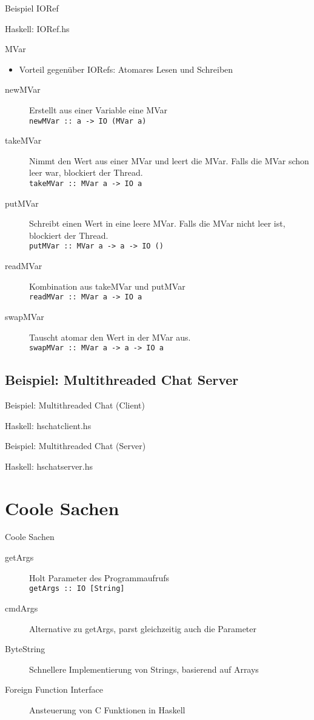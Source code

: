 \documentclass{beamer}
\newcommand{\code}[2]
{
	\begin{block}{#1: #2}
	
	\end{block}
}
\begin{document}
\begin{frame}[fragile]{Beispiel IORef}
\tiny
\code{Haskell}{IORef.hs}
\end{frame}

\begin{frame}[<+->]{MVar}
\begin{itemize}
\item Vorteil gegenüber IORefs: Atomares Lesen und Schreiben
\end{itemize}
\begin{description}
\item[newMVar] Erstellt aus einer Variable eine MVar \\ \texttt{newMVar :: a -> IO (MVar a)}
\item[takeMVar] Nimmt den Wert aus einer MVar und leert die MVar. Falls die MVar schon leer war, blockiert der Thread. \\ \texttt{takeMVar :: MVar a -> IO a}
\item[putMVar] Schreibt einen Wert in eine leere MVar. Falls die MVar nicht leer ist, blockiert der Thread. \\
\texttt{putMVar :: MVar a -> a -> IO ()}
\item[readMVar] Kombination aus takeMVar und putMVar \\ \texttt{readMVar :: MVar a -> IO a}
\item[swapMVar] Tauscht atomar den Wert in der MVar aus. \\ \texttt{swapMVar :: MVar a -> a -> IO a}
\end{description}
\end{frame}

\subsection{Beispiel: Multithreaded Chat Server}
\begin{frame}{Beispiel: Multithreaded Chat (Client)}
\tiny
\code{Haskell}{hschatclient.hs}
\end{frame}
\begin{frame}{Beispiel: Multithreaded Chat (Server) }
\tiny
\code{Haskell}{hschatserver.hs}
\end{frame}

\section{Coole Sachen}
\begin{frame}[<+->]{Coole Sachen}
\begin{description}
\item[getArgs] Holt Parameter des Programmaufrufs \\ \texttt{getArgs :: IO [String]}
\item[cmdArgs] Alternative zu getArgs, parst gleichzeitig auch die Parameter
\item[ByteString] Schnellere Implementierung von Strings, basierend auf Arrays
\item[Foreign Function Interface] Ansteuerung von C Funktionen in Haskell
\end{description}
\end{frame}
\end{document}
